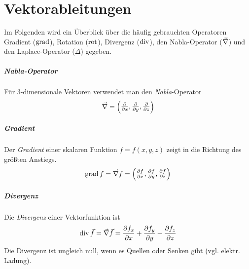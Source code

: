 
\appendix
\chapter{Vektorableitungen}\label{vektorableitungen}
Im Folgenden wird ein Überblick über die häufig gebrauchten Operatoren 
Gradient ($\Grad$), Rotation ($\Rot$), Divergenz ($\Div$), den Nabla-Operator
($\vecna$) und den Laplace-Operator ($\Delta$) gegeben.

\paragraph*{Nabla-Operator}
Für 3-dimensionale Vektoren verwendet man den 
\emph{Nabla}-Operator%
%
\begin{gather*}
  \vecna = 
  \begin{pmatrix}
    \dif[]{x}, \dif[]{y}, \dif[]{z}
  \end{pmatrix}
\end{gather*}

\paragraph*{Gradient}
Der \emph{Gradient}%
%
einer skalaren Funktion $f=f(x,y,z)$ zeigt in die Richtung des größten Anstiegs.
\begin{gather*}
  \Grad f = \vecna f = 
  \begin{pmatrix}
    \dif[f]{x},\dif[f]{y},\dif[f]{z}
  \end{pmatrix}
\end{gather*}

\paragraph*{Divergenz}
Die \emph{Divergenz}%
%
einer Vektorfunktion ist
\begin{gather*}
  \Div\vec{f} = \vecna\vec{f}
  = \dif[f_{x}]{x}+\dif[f_{y}]{y}+\dif[f_{z}]{z}
\end{gather*}
Die Divergenz ist ungleich null, wenn es Quellen oder Senken gibt
(vgl. elektr. Ladung).


